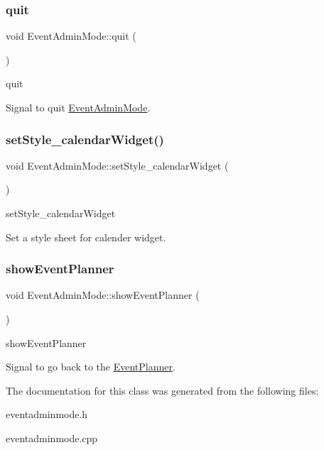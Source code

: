 \subsubsection{\texorpdfstring{quit}{quit}}
{\footnotesize\ttfamily void Event\+Admin\+Mode\+::quit (\begin{DoxyParamCaption}{ }\end{DoxyParamCaption})\hspace{0.3cm}{\ttfamily [signal]}}



quit 

Signal to quit \hyperlink{class_event_admin_mode}{Event\+Admin\+Mode}. \mbox{\label{class_event_admin_mode_a8e7abbf82a05352cacc29d544a682139}} 
\subsubsection{\texorpdfstring{set\+Style\+\_\+calendar\+Widget()}{setStyle\_calendarWidget()}}
{\footnotesize\ttfamily void Event\+Admin\+Mode\+::set\+Style\+\_\+calendar\+Widget (\begin{DoxyParamCaption}{ }\end{DoxyParamCaption})}



set\+Style\+\_\+calendar\+Widget 

Set a style sheet for calender widget. \mbox{\label{class_event_admin_mode_aff26ca6ac01a61846ccef0e55cc274de}} 
\subsubsection{\texorpdfstring{show\+Event\+Planner}{showEventPlanner}}
{\footnotesize\ttfamily void Event\+Admin\+Mode\+::show\+Event\+Planner (\begin{DoxyParamCaption}{ }\end{DoxyParamCaption})\hspace{0.3cm}{\ttfamily [signal]}}



show\+Event\+Planner 

Signal to go back to the \hyperlink{class_event_planner}{Event\+Planner}. 

The documentation for this class was generated from the following files\+:\begin{DoxyCompactItemize}
\item 
eventadminmode.\+h\item 
eventadminmode.\+cpp\end{DoxyCompactItemize}
